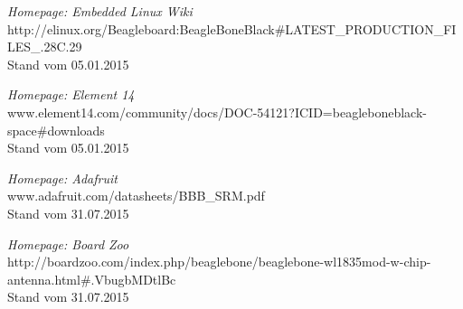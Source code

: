 \begin{thebibliography}{BA}

	 \emph{Homepage: Embedded Linux Wiki}
	\\http://elinux.org/Beagleboard:BeagleBoneBlack\#LATEST\_PRODUCTION\_FILES\_.28C.29
	\\Stand vom 05.01.2015
	
	 \emph{Homepage: Element 14}
	\\www.element14.com/community/docs/DOC-54121?ICID=beagleboneblack-space\#downloads
	\\Stand vom 05.01.2015
	
	 \emph{Homepage: Adafruit}
	\\www.adafruit.com/datasheets/BBB\_SRM.pdf
	\\Stand vom 31.07.2015
	
	 \emph{Homepage: Board Zoo}
	\\http://boardzoo.com/index.php/beaglebone/beaglebone-wl1835mod-w-chip-antenna.html\#.VbugbMDtlBc
	\\Stand vom 31.07.2015
	




\end{thebibliography}

